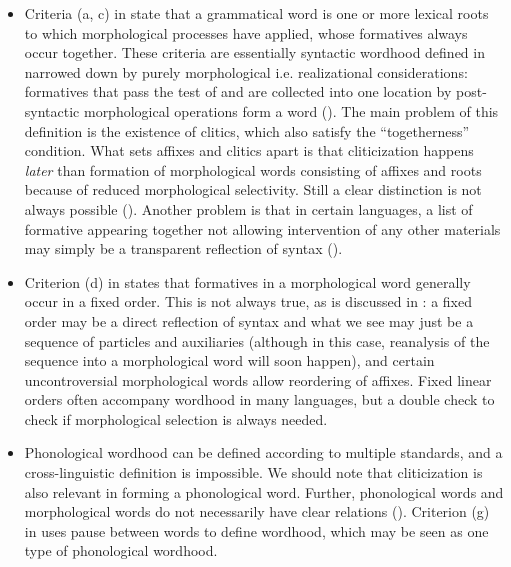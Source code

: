 \documentclass[a4paper, oneside, scheme=plain, 12pt]{article}
\newcommand*{\citepage}[1]{p.~{#1}}
\newcommand*{\citepages}[1]{pp.~{#1}}
\begin{document}
\begin{itemize}
    \item Criteria (a, c) in \citet[\citepages{13-16}]{dixon2010basic2} state that 
    a grammatical word is one or more lexical roots to which morphological processes have applied,
    whose formatives always occur together.
    These criteria are essentially syntactic wordhood defined in 
    narrowed down by purely morphological i.e. realizational considerations:
    formatives that pass the test of  
    and are collected into one location by post-syntactic morphological operations
    form a word ().
    The main problem of this definition is the existence of clitics,
    which also satisfy the ``togetherness'' condition.
    What sets affixes and clitics apart is that cliticization happens \emph{later} than formation of morphological words consisting of affixes and roots
    because of reduced morphological selectivity.
    Still a clear distinction is not always possible ().
    Another problem is that in certain languages,
    a list of formative appearing together not allowing intervention of any other materials
    may simply be a transparent reflection of syntax ().
    
    \item Criterion (d) in \citet[\citepage{14}]{dixon2010basic2} states that formatives in a morphological word generally occur in a fixed order.
    This is not always true, as is discussed in :
    a fixed order may be a direct reflection of syntax
    and what we see may just be a sequence of particles and auxiliaries
    (although in this case, reanalysis of the sequence into a morphological word will soon happen),
    and certain uncontroversial morphological words allow reordering of affixes.
    Fixed linear orders often accompany wordhood in many languages,
    but a double check to check if morphological selection is always needed.

    \item Phonological wordhood can be defined according to multiple standards,
    and a cross-linguistic definition is impossible.
    We should note that cliticization is also relevant in forming a phonological word.
    Further, phonological words and morphological words do not necessarily have clear relations
    ().
    Criterion (g) in \citet[\citepage{18}]{dixon2010basic2} uses pause between words to define  wordhood, which may be seen as one type of phonological wordhood.
\end{itemize}
\end{document}
